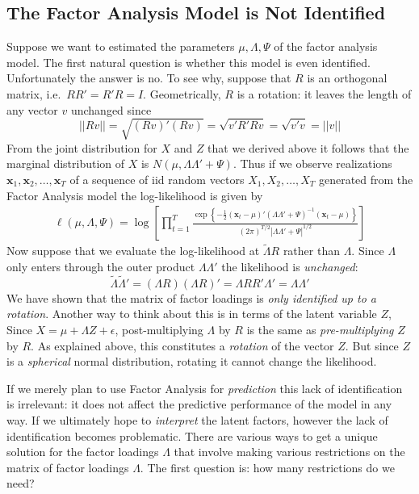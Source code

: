 \documentclass[12pt]{article}
\theoremstyle{definition}
\begin{document}
\subsection{The Factor Analysis Model is Not Identified}
Suppose we want to estimated the parameters $\mu, \Lambda, \Psi$ of the factor analysis model. The first natural question is whether this model is even identified. Unfortunately the answer is no. To see why, suppose that $R$ is an orthogonal matrix, i.e.\ $RR' = R'R = I$. Geometrically, $R$ is a rotation: it leaves the length of any vector $v$ unchanged since
	$$|| Rv || = \sqrt{(Rv)'(Rv)} = \sqrt{v' R'R v} = \sqrt{v'v} = ||v||$$ 
From the joint distribution for $X$ and $Z$ that we derived above it follows that the marginal distribution of $X$ is $N(\mu, \Lambda \Lambda' + \Psi)$. Thus if we observe realizations $\mathbf{x}_1, \mathbf{x}_2, \hdots, \mathbf{x}_T$ of a sequence of iid random vectors $X_1, X_2, \hdots, X_T$ generated from the Factor Analysis model the log-likelihood is given by
	\begin{eqnarray*}
		\ell(\mu, \Lambda, \Psi) = \log \left[ \prod_{t = 1}^T \frac{\exp \left\{ -\frac{1}{2} \left(\mathbf{x}_t - \mu \right)' \left(\Lambda \Lambda' + \Psi \right)^{-1} \left(\mathbf{x}_t - \mu \right)\right\}}{(2\pi)^{T/2}\left| \Lambda \Lambda' + \Psi \right|^{1/2}} \right] 
	\end{eqnarray*}
Now suppose that we evaluate the log-likelihood at $\widetilde{\Lambda}R$ rather than $\Lambda$. Since $\Lambda$ only enters through the outer product $\Lambda \Lambda'$ the likelihood is \emph{unchanged}: 
	$$\widetilde{\Lambda} \widetilde{\Lambda}' = (\Lambda R)(\Lambda R)' = \Lambda RR' \Lambda' = \Lambda \Lambda'$$
We have shown that the matrix of factor loadings is \emph{only identified up to a rotation}. Another way to think about this is in terms of the latent variable $Z$, Since $X = \mu + \Lambda Z + \epsilon$, post-multiplying $\Lambda$ by $R$ is the same as \emph{pre-multiplying} $Z$ by $R$. As explained above, this constitutes a \emph{rotation} of the vector $Z$. But since $Z$ is a \emph{spherical} normal distribution, rotating it cannot change the likelihood.


If we merely plan to use Factor Analysis for \emph{prediction} this lack of identification is irrelevant: it does not affect the predictive performance of the model in any way. If we ultimately hope to \emph{interpret} the latent factors, however the lack of identification becomes problematic. There are various ways to get a unique solution for the factor loadings $\Lambda$ that involve making various restrictions on the matrix of factor loadings $\Lambda$. The first question is: how many restrictions do we need?
\end{document}
